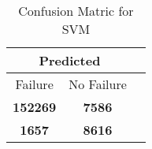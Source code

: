 \begin{table}[] 
\caption{Confusion Matric for SVM} 
\label{Table: Prediction Accuracy-NoneSVM85.0EKF-ignoreReflection-Reflection} 
\centering 
\begin{tabular} 
 {@{}ccc@{}} 
\toprule 
\multicolumn{2}{c}{\textbf{Predicted}}
 \\ \midrule 
\multicolumn{1}{|c|}{Failure} & 
\multicolumn{1}{c|}{No Failure}
 \\ \midrule 
\multicolumn{1}{|c|}{\color{green}\textbf{152269}} & 
\multicolumn{1}{c|}{\color{red}\textbf{7586}}
 \\ \midrule 
\multicolumn{1}{|c|}{\color{red}\textbf{1657}} & 
\multicolumn{1}{c|}{\color{green}\textbf{8616}}
 \\ \bottomrule 
\end{tabular} 
\end{table} 
